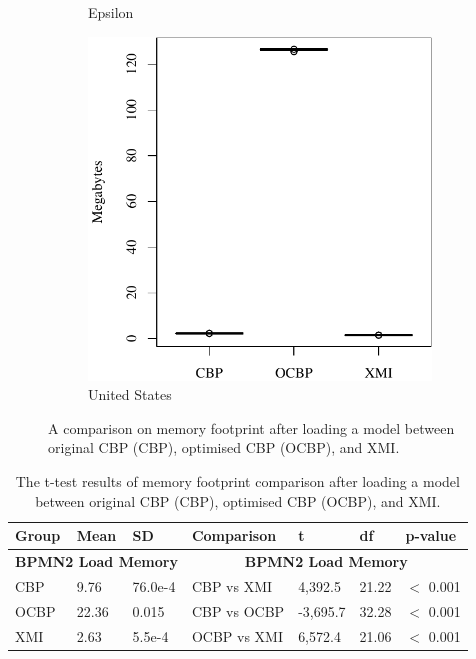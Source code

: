 \documentclass{llncs}
\begin{document}
{\begin{figure}[ht]
\begin{subfigure}{0.325\textwidth}
            \caption{Epsilon}
            \label{fig:load_memory_epsilon}
        \end{subfigure}
        \hfill
        \begin{subfigure}{0.325\textwidth}
            \centering
            \includegraphics[width=\linewidth]{images/load_memory_wikipedia}
            \caption{United States}
            \label{fig:load_memory_wikipedia}
        \end{subfigure}
        \caption{A comparison on memory footprint after loading a model between original CBP (CBP), optimised CBP (OCBP), and XMI.}
        \label{fig:loadmemory}
    \end{figure}

     \begin{table}[t]
        \footnotesize
        \centering
        \caption{The t-test results of memory footprint comparison after loading a model between original CBP (CBP), optimised CBP (OCBP), and XMI.}
        \label{table:ttest_results_load_memory}
        \begin{tabular}
            {|p{}p{}p{}|p{}p{}p{}p{}|}
            \hline 
            
            Group & Mean & SD & Comparison & t  & df & p-value \\
            \hline 
            \multicolumn{3}{|c|}{\textbf{BPMN2 Load Memory}} & \multicolumn{4}{c|}{\textbf{BPMN2 Load Memory}} \\
            CBP & 9.76     & 76.0e-4 & CBP vs XMI &  4,392.5   & 21.22 & $<$ 0.001 \\  
            OCBP & 22.36   & 0.015 & CBP vs OCBP & -3,695.7 & 32.28  & $<$ 0.001 \\  
            XMI &  2.63   & 5.5e-4 & OCBP vs XMI &  6,572.4    & 21.06  & $<$ 0.001 \\ 
            \hline 
            

\end{tabular}
\end{table}}
\end{document}
